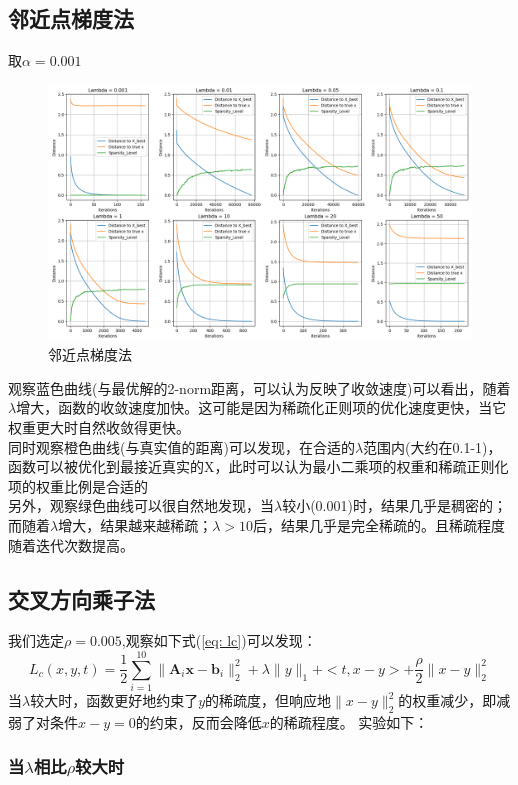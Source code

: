 \documentclass{article}
\begin{document}
\subsection{邻近点梯度法}
取$\alpha=0.001$
\begin{figure}[H]
    \centering
    \includegraphics[width=\linewidth]{./images/Figure_1.png}
    \caption{邻近点梯度法}
\end{figure}
观察蓝色曲线(与最优解的2-norm距离，可以认为反映了收敛速度)可以看出，随着$\lambda$增大，函数的收敛速度加快。这可能是因为稀疏化正则项的优化速度更快，当它权重更大时自然收敛得更快。\\
同时观察橙色曲线(与真实值的距离)可以发现，在合适的$\lambda$范围内(大约在0.1-1)，函数可以被优化到最接近真实的X，此时可以认为最小二乘项的权重和稀疏正则化项的权重比例是合适的\\
另外，观察绿色曲线可以很自然地发现，当$\lambda$较小(0.001)时，结果几乎是稠密的；而随着$\lambda$增大，结果越来越稀疏；$\lambda>10$后，结果几乎是完全稀疏的。且稀疏程度随着迭代次数提高。
\newpage
\subsection{交叉方向乘子法}
我们选定$\rho=0.005$,观察如下式(\ref{eq: lc})可以发现：
\begin{equation*}
    L_c(x,y,t) = \frac {1}{2} \sum_{i=1}^{10} \|\mathbf{A}_i \mathbf{x} - \mathbf{b}_i\|_2^2+
    \lambda\|y\|_1+<t, x-y>+\frac{\rho}{2}\|x-y\|_2^2
\end{equation*}
当$\lambda$较大时，函数更好地约束了$y$的稀疏度，但响应地$\|x-y\|_2^2$的权重减少，即减弱了对条件$x - y =0$的约束，反而会降低$x$的稀疏程度。
实验如下：\\
\subsubsection{当$\lambda$相比$\rho$较大时}
\end{document}

